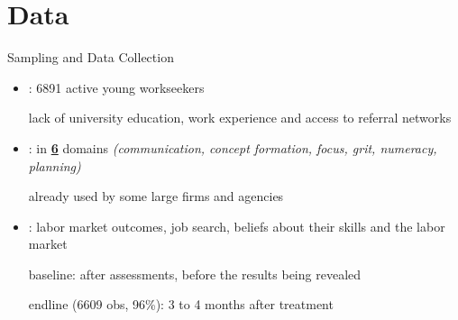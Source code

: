 \section{Data}

 \frame{\sectionpage}

    \begin{frame}{Sampling and Data Collection}
        \begin{itemize}
            \item {}: 6891 active young workseekers
            
            \hfill {\footnotesize lack of university education, work experience and access to referral networks} %
            \item {}: in \textbf{\underline{6}} domains \textit{\footnotesize(communication, concept formation, focus, grit, numeracy, planning)}
            
            \hfill {\small already used by some large firms and agencies}
            \item {}: labor market outcomes, job search, beliefs about their skills and the labor market
            
            \hfill {\small baseline: after assessments, before the results being revealed}

            \hfill {\small endline (6609 obs, 96\%): 3 to 4 months after treatment}
        \end{itemize}
    \end{frame}

